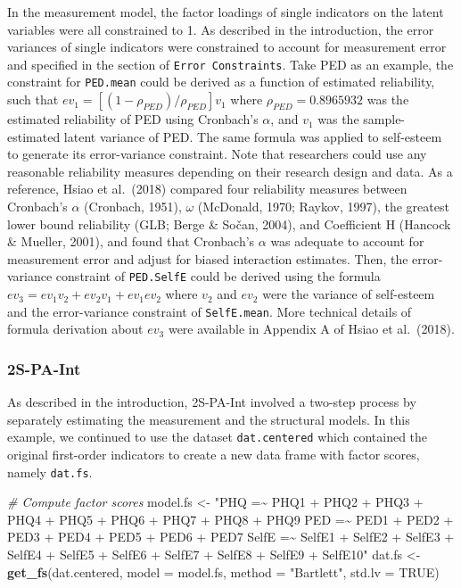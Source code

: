 \documentclass[
  man]{apa7}
\newenvironment{Shaded}{\begin{snugshade}}{\end{snugshade}}
\newcommand{\AttributeTok}[1]{\textcolor[rgb]{0.13,0.29,0.53}{#1}}
\newcommand{\CommentTok}[1]{\textcolor[rgb]{0.56,0.35,0.01}{\textit{#1}}}
\newcommand{\ConstantTok}[1]{\textcolor[rgb]{0.56,0.35,0.01}{#1}}
\newcommand{\FunctionTok}[1]{\textcolor[rgb]{0.13,0.29,0.53}{\textbf{#1}}}
\newcommand{\NormalTok}[1]{#1}
\newcommand{\OtherTok}[1]{\textcolor[rgb]{0.56,0.35,0.01}{#1}}
\newcommand{\StringTok}[1]{\textcolor[rgb]{0.31,0.60,0.02}{#1}}
\begin{document}
In the measurement model, the factor loadings of single indicators on the latent variables were all constrained to 1. As described in the introduction, the error variances of single indicators were constrained to account for measurement error and specified in the section of \texttt{Error\ Constraints}. Take PED as an example, the constraint for \texttt{PED.mean} could be derived as a function of estimated reliability, such that \(ev_{1} = [(1 - \rho_{PED})/{\rho_{PED}}]v_{1}\) where \(\rho_{PED} = 0.8965932\) was the estimated reliability of PED using Cronbach's \(\alpha\), and \(v_{1}\) was the sample-estimated latent variance of PED. The same formula was applied to self-esteem to generate its error-variance constraint. Note that researchers could use any reasonable reliability measures depending on their research design and data. As a reference, Hsiao et al.~(2018) compared four reliability measures between Cronbach's \(\alpha\) (Cronbach, 1951), \(\omega\) (McDonald, 1970; Raykov, 1997), the greatest lower bound reliability (GLB; Berge \& Sočan, 2004), and Coefficient H (Hancock \& Mueller, 2001), and found that Cronbach's \(\alpha\) was adequate to account for measurement error and adjust for biased interaction estimates.
Then, the error-variance constraint of \texttt{PED.SelfE} could be derived using the formula \(ev_{3} = ev_{1}v_{2} + ev_{2}v_{1} + ev_{1}ev_{2}\) where \(v_{2}\) and \(ev_{2}\) were the variance of self-esteem and the error-variance constraint of \texttt{SelfE.mean}. More technical details of formula derivation about \(ev_{3}\) were available in Appendix A of Hsiao et al.~(2018).

\hypertarget{s-pa-int}{%
\subsubsection{2S-PA-Int}\label{s-pa-int}}

As described in the introduction, 2S-PA-Int involved a two-step process by separately estimating the measurement and the structural models. In this example, we continued to use the dataset \texttt{dat.centered} which contained the original first-order indicators to create a new data frame with factor scores, namely \texttt{dat.fs}.

\footnotesize

\begin{Shaded}
\begin{Highlighting}[]
\CommentTok{\# Compute factor scores}
\NormalTok{model.fs }\OtherTok{\textless{}{-}} \StringTok{"PHQ =\textasciitilde{} PHQ1 + PHQ2 + PHQ3 + PHQ4 + PHQ5 + PHQ6 + PHQ7 + PHQ8 + PHQ9}
\StringTok{             PED =\textasciitilde{} PED1 + PED2 + PED3 + PED4 + PED5 + PED6 + PED7}
\StringTok{             SelfE =\textasciitilde{} SelfE1 + SelfE2 + SelfE3 + SelfE4 + SelfE5 + }
\StringTok{                      SelfE6 + SelfE7 + SelfE8 + SelfE9 + SelfE10"}
\NormalTok{dat.fs }\OtherTok{\textless{}{-}} \FunctionTok{get\_fs}\NormalTok{(dat.centered,}
                 \AttributeTok{model =}\NormalTok{ model.fs,}
                 \AttributeTok{method =} \StringTok{"Bartlett"}\NormalTok{,}
                 \AttributeTok{std.lv =} \ConstantTok{TRUE}\NormalTok{)}
\end{Highlighting}
\end{Shaded}
\end{document}

